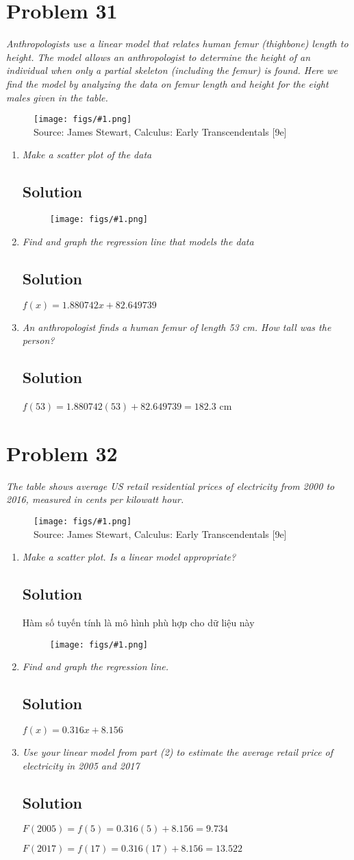 \documentclass[11pt]{article}
\newcommand{\soln}{\subsection*}
\newcommand{\qn}{\textit}
\newcommand{\imagesource}[1]{{\footnotesize Source: #1}}
\newcommand{\imgqn}[1]{
	\begin{figure}[H]
		\centering
		\texttt{[image: figs/\#1.png]}\\
		\imagesource{James Stewart, Calculus: Early Transcendentals [9e]}
	\end{figure}
}
\newcommand{\imgsoln}[1]{
	\begin{figure}[H]
		\centering
		\texttt{[image: figs/\#1.png]}
	\end{figure}
}
\begin{document}
\section*{Problem 31}

\qn{Anthropologists use a linear model that relates human femur (thighbone) length to height. The model allows an anthropologist to determine the height of an individual when only a partial skeleton (including the femur) is found. Here we find the model by analyzing the data on femur length and height for the eight males given in the table.}

\imgqn{1.2.31}

\begin{enumerate}
	\item \qn{Make a scatter plot of the data}
	\soln{Solution}
	\imgsoln{1.2.31-ans.a}
	
	\item \qn{Find and graph the regression line that models the data}
	\soln{Solution}
	$f(x)=1.880742x+82.649739$
	
	\item \qn{An anthropologist finds a human femur of length 53 cm. How tall was the person?}
	\soln{Solution}
	$f(53)=1.880742(53)+82.649739=182.3$ cm
\end{enumerate}

\section*{Problem 32}

\qn{The table shows average US retail residential prices of electricity from 2000 to 2016, measured in cents per kilowatt hour.}

\imgqn{1.2.32}

\begin{enumerate}
	\item \qn{Make a scatter plot. Is a linear model appropriate?}
	\soln{Solution}
	Hàm số tuyến tính là mô hình phù hợp cho dữ liệu này
	\imgsoln{1.2.32-ans.a}
	
	\item \qn{Find and graph the regression line.}
	\soln{Solution}
	$f(x)=0.316x+8.156$
	
	\item \qn{Use your linear model from part (2) to estimate the average retail price of electricity in 2005 and 2017}
	\soln{Solution}
	$F(2005)=f(5)=0.316(5)+8.156=9.734$
	
	$F(2017)=f(17)=0.316(17)+8.156=13.522$
\end{enumerate}
\end{document}

